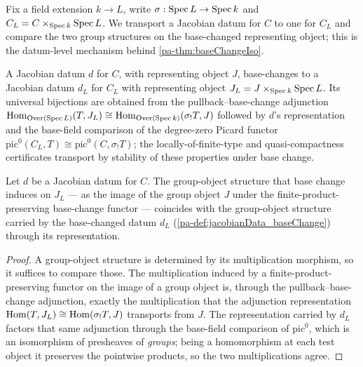 Fix a field extension \(k \to L\), write \(\sigma : \operatorname{Spec} L \to \operatorname{Spec} k\) and
\(C_L = C \times_{\operatorname{Spec} k} \operatorname{Spec} L\). We transport a Jacobian datum for \(C\) to one for
\(C_L\) and compare the two group structures on the base-changed representing object; this is the
datum-level mechanism behind \ref{pa-thm:baseChangeIso}.

\begin{definition}
  \label{pa-def:jacobianData_baseChange}
  \leanok

  A Jacobian datum \(d\) for \(C\), with representing object \(J\), base-changes to a Jacobian datum
  \(d_L\) for \(C_L\) with representing object \(J_L = J \times_{\operatorname{Spec} k} \operatorname{Spec} L\). Its universal
  bijections are obtained from the pullback--base-change adjunction
  \(\operatorname{Hom}_{\mathrm{Over}(\operatorname{Spec} L)}(T, J_L) \cong \operatorname{Hom}_{\mathrm{Over}(\operatorname{Spec} k)}(\sigma_! T, J)\) followed by \(d\)'s
  representation and the base-field comparison of the degree-zero Picard functor
  \(\mathrm{pic}^0(C_L, T) \cong \mathrm{pic}^0(C, \sigma_! T)\); the locally-of-finite-type and
  quasi-compactness certificates transport by stability of these properties under base change.
\end{definition}

\begin{lemma}
  \label{pa-lem:grpObjObj_baseChange_eq}
  \leanok

  Let \(d\) be a Jacobian datum for \(C\). The group-object structure that base change induces on
  \(J_L\) --- as the image of the group object \(J\) under the finite-product-preserving base-change
  functor --- coincides with the group-object structure carried by the base-changed datum \(d_L\)
  (\ref{pa-def:jacobianData_baseChange}) through its representation.
\end{lemma}
\begin{proof}
  \leanok
  A group-object structure is determined by its multiplication morphism, so it suffices to compare
  those. The multiplication induced by a finite-product-preserving functor on the image of a group
  object is, through the pullback--base-change adjunction, exactly the multiplication that the
  adjunction representation \(\operatorname{Hom}(T, J_L) \cong \operatorname{Hom}(\sigma_! T, J)\) transports from \(J\). The
  representation carried by \(d_L\) factors that same adjunction through the base-field comparison of
  \(\mathrm{pic}^0\), which is an isomorphism of presheaves of \emph{groups}; being a homomorphism at
  each test object it preserves the pointwise products, so the two multiplications agree.
\end{proof}

